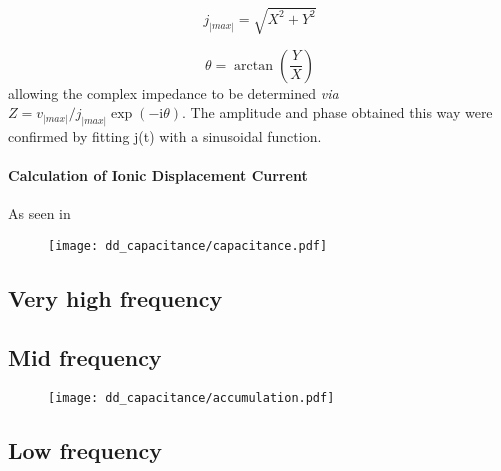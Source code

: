 \begin{equation}
j_|max| = \sqrt{X^2 + Y^2}
\end{equation}

\begin{equation}
\theta = \arctan(\frac{Y}{X})
\end{equation}
allowing the complex impedance to be determined \textsl{via} $Z = v_|max| / j_|max| \exp(-\mathrm{i}\theta)$.
The amplitude and phase
obtained this way were confirmed by fitting j(t) with a sinusoidal function.

\paragraph{Calculation of Ionic Displacement Current}\label{displacement_current_ionic}
As seen in 


\begin{figure}
	\centering
	\texttt{[image: dd\_capacitance/capacitance.pdf]}
	\label{fig:impedance-capacitance}
\end{figure}

\subsection{Very high frequency}



\subsection{Mid frequency}
\begin{figure}
	\centering
	\texttt{[image: dd\_capacitance/accumulation.pdf]}
	\label{fig:impedance-accumulation}
\end{figure}

\subsection{Low frequency}

